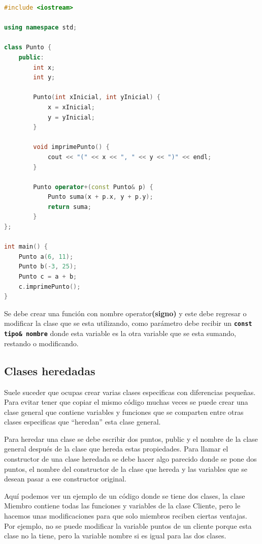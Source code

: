 \documentclass{article}
\begin{document}
\begin{lstlisting}[language=C++, title=Sobrecargamiento de operadores]
#include <iostream>

using namespace std;

class Punto {
	public:
		int x;
		int y;

		Punto(int xInicial, int yInicial) {
			x = xInicial;
			y = yInicial;
		}

		void imprimePunto() {
			cout << "(" << x << ", " << y << ")" << endl;
		}

		Punto operator+(const Punto& p) {
			Punto suma(x + p.x, y + p.y);
			return suma;
		}
};

int main() {
	Punto a(6, 11);
	Punto b(-3, 25);
	Punto c = a + b;
	c.imprimePunto();
}
\end{lstlisting}

Se debe crear una función con nombre operator\textbf{(signo)} y este debe regresar o modificar la clase que se esta utilizando, como parámetro debe recibir un \textbf{\lstinline{const tipo& nombre}} donde esta variable es la otra variable que se esta sumando, restando o modificando.

\subsection{Clases heredadas}

Suele suceder que ocupas crear varias clases especificas con diferencias pequeñas. Para evitar tener que copiar el mismo código muchas veces se puede crear una clase general que contiene variables y funciones que se comparten entre otras clases especificas que ``heredan'' esta clase general.

Para heredar una clase se debe escribir dos puntos, public y el nombre de la clase general después de la clase que hereda estas propiedades. Para llamar el constructor de una clase heredada se debe hacer algo parecido donde se pone dos puntos, el nombre del constructor de la clase que hereda y las variables que se desean pasar a ese constructor original.

Aquí podemos ver un ejemplo de un código donde se tiene dos clases, la clase Miembro contiene todas las funciones y variables de la clase Cliente, pero le hacemos unas modificaciones para que solo miembros reciben ciertas ventajas. Por ejemplo, no se puede modificar la variable puntos de un cliente porque esta clase no la tiene, pero la variable nombre si es igual para las dos clases.
\end{document}
